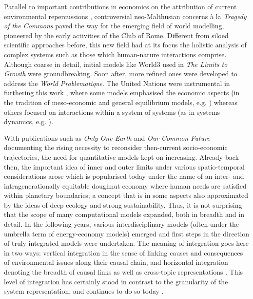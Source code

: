Parallel to important contributions in economics on the attribution of current environmental repercussions \parencite[see for example][]{leontief_1970,leontief_1972}, controversial neo-Malthusian concerns à la \textit{Tragedy of the Commons} \parencite{hardin_1968,ostrom_1999,mildenberger_2019} paved the way for the emerging field of world modelling, pioneered by the early activities of the Club of Rome. Different from siloed scientific approaches before, this new field had at its focus the holistic analysis of complex systems such as those which human-nature interactions comprise. Although coarse in detail, initial models like World3 used in \textit{The Limits to Growth} \parencite{meadows_1972} were groundbreaking. Soon after, more refined ones were developed to address the \textit{World Problematique}. The United Nations were instrumental in furthering this work \parencite{fontela_2004}, where some models emphasised the economic aspects (in the tradition of meso-economic and general equilibrium models, e.g. \textcite{leontief_1974}) whereas others focused on interactions within a system of systems (as in systems dynamics, e.g. \textcite{mesarovic_1974}).

With publications such as \textit{Only One Earth} \parencite{ward_1972} and \textit{Our Common Future} \parencite*[WCED,][]{brundtland_1987} documenting the rising necessity to reconsider then-current socio-economic trajectories, the need for quantitative models kept on increasing. Already back then, the important idea of inner and outer limits under various spatio-temporal considerations arose which is popularised today under the name of an inter- and intragenerationally equitable doughnut economy where human needs are satisfied within planetary boundaries; a concept that is in some aspects also approximated by the ideas of deep ecology and strong sustainability. Thus, it is not surprising that the scope of many computational models expanded, both in breadth and in detail. In the following years, various interdisciplinary models (often under the umbrella term of energy-economy models) emerged and first steps in the direction of truly integrated models were undertaken. The meaning of integration goes here in two ways: vertical integration in the sense of linking causes and consequences of environmental issues along their causal chain, and horizontal integration denoting the breadth of causal links as well as cross-topic representations \parencite{parson_1997}. This level of integration has certainly stood in contrast to the granularity of the system representation, and continues to do so today \parencite{krey_2014}.

